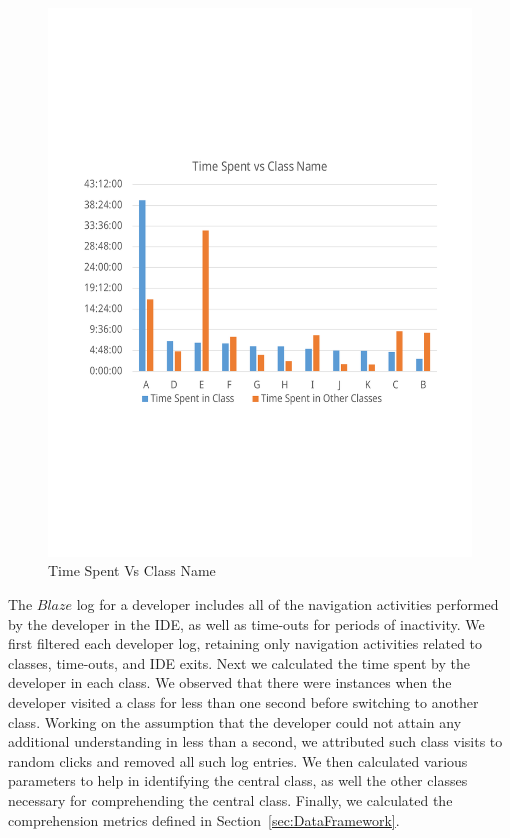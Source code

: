 \begin{figure}
\includegraphics[width=\columnwidth]{ForPaper}
\caption{Time Spent Vs Class Name}
\label{fig:ForPaper}
\end{figure}

The $Blaze$ log for a developer includes all of the navigation activities performed by the developer in the IDE, as well as time-outs for periods of inactivity. We first filtered each developer log, retaining only navigation activities related to classes, time-outs, and IDE exits. Next we calculated the time spent by the developer in each class. We observed that there were instances when the developer visited a class for less than one second before switching to another class. Working on the assumption that the developer could not attain any additional understanding in less than a second,  we attributed such class visits to random clicks and removed all such log entries. We then calculated various parameters to help in identifying the central class, as well the other classes necessary for comprehending the central class.   Finally, we calculated the comprehension metrics defined in Section~\ref{sec:DataFramework}.

